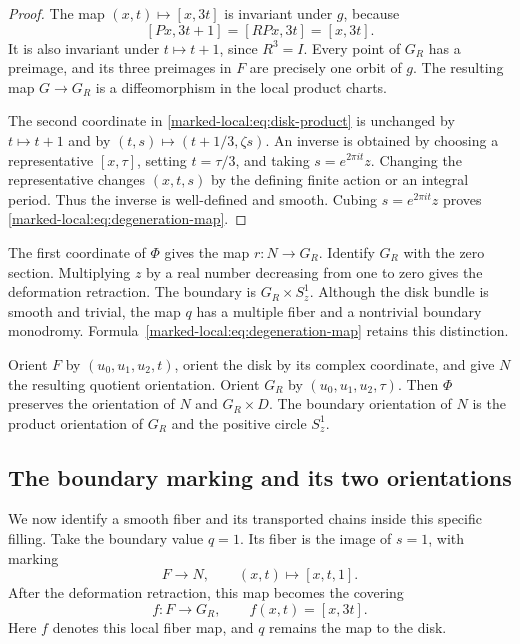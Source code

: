 \begin{proof}
The map $(x,t)\mapsto[x,3t]$ is invariant under $g$, because
\[
 [Px,3t+1]=[RPx,3t]=[x,3t].
\]
It is also invariant under $t\mapsto t+1$, since $R^3=I$.
Every point of $G_R$ has a preimage, and its three preimages in $F$
are precisely one orbit of $g$. The resulting map $G\to G_R$
is a diffeomorphism in the local product charts.

The second coordinate in \eqref{marked-local:eq:disk-product} is unchanged by
$t\mapsto t+1$ and by $(t,s)\mapsto(t+1/3,\zeta s)$.
An inverse is obtained by choosing a representative $[x,\tau]$,
setting $t=\tau/3$, and taking $s=e^{2\pi it}z$.
Changing the representative changes $(x,t,s)$ by the defining finite
action or an integral period. Thus the inverse is well-defined and
smooth. Cubing $s=e^{2\pi it}z$ proves
\eqref{marked-local:eq:degeneration-map}.
\end{proof}

The first coordinate of $\Phi$ gives the map $r:N\to G_R$.
Identify $G_R$ with the zero section. Multiplying $z$ by a real number
decreasing from one to zero gives the deformation retraction.
The boundary is $G_R\times S^1_z$. Although the disk bundle is smooth
and trivial, the map $q$ has a multiple fiber and a nontrivial boundary
monodromy. Formula~\eqref{marked-local:eq:degeneration-map} retains this distinction.

Orient $F$ by $(u_0,u_1,u_2,t)$, orient the disk by its complex
coordinate, and give $N$ the resulting quotient orientation.
Orient $G_R$ by $(u_0,u_1,u_2,\tau)$. Then $\Phi$ preserves the
orientation of $N$ and $G_R\times D$. The boundary orientation of
$N$ is the product orientation of $G_R$ and the positive circle $S^1_z$.

\subsection{The boundary marking and its two orientations}

We now identify a smooth fiber and its transported chains inside this
specific filling. Take the boundary value $q=1$. Its fiber is the
image of $s=1$, with marking
\begin{equation}\label{marked-local:eq:fibre-inclusion}
 F\longrightarrow N,\qquad (x,t)\longmapsto[x,t,1].
\end{equation}
After the deformation retraction, this map becomes the covering
\begin{equation}\label{marked-local:eq:cover-map}
             f:F\longrightarrow G_R,
             \qquad f(x,t)=[x,3t].
\end{equation}
Here $f$ denotes this local fiber map, and $q$ remains the map to the disk.

